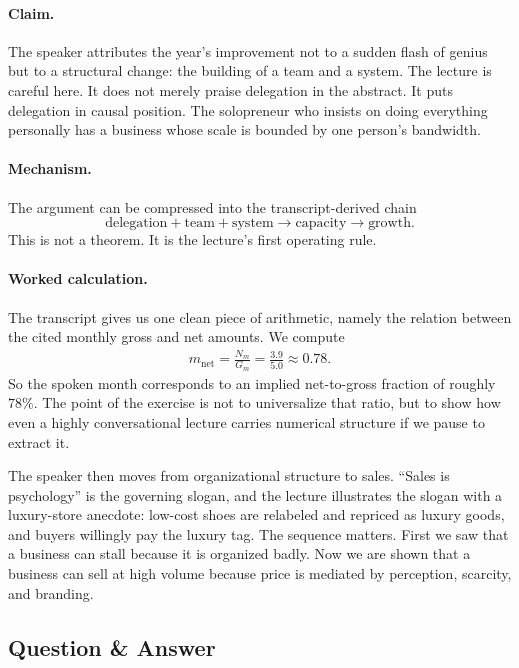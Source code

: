 \paragraph{Claim.}
The speaker attributes the year's improvement not to a sudden flash of genius but to a structural change: the building of a team and a system. The lecture is careful here. It does not merely praise delegation in the abstract. It puts delegation in causal position. The solopreneur who insists on doing everything personally has a business whose scale is bounded by one person's bandwidth.

\paragraph{Mechanism.}
The argument can be compressed into the transcript-derived chain
\begin{equation}
\text{delegation}+\text{team}+\text{system}
\rightarrow
\text{capacity}
\rightarrow
\text{growth}.
\end{equation}
This is not a theorem. It is the lecture's first operating rule.

\paragraph{Worked calculation.}
The transcript gives us one clean piece of arithmetic, namely the relation between the cited monthly gross and net amounts. We compute
\begin{align}
m_{\text{net}}
=
\frac{N_m}{G_m}
=
\frac{3.9}{5.0}
\approx 0.78.
\end{align}
So the spoken month corresponds to an implied net-to-gross fraction of roughly \(78\%\). The point of the exercise is not to universalize that ratio, but to show how even a highly conversational lecture carries numerical structure if we pause to extract it.

The speaker then moves from organizational structure to sales. ``Sales is psychology'' is the governing slogan, and the lecture illustrates the slogan with a luxury-store anecdote: low-cost shoes are relabeled and repriced as luxury goods, and buyers willingly pay the luxury tag. The sequence matters. First we saw that a business can stall because it is organized badly. Now we are shown that a business can sell at high volume because price is mediated by perception, scarcity, and branding.

\subsection{Question \& Answer}

